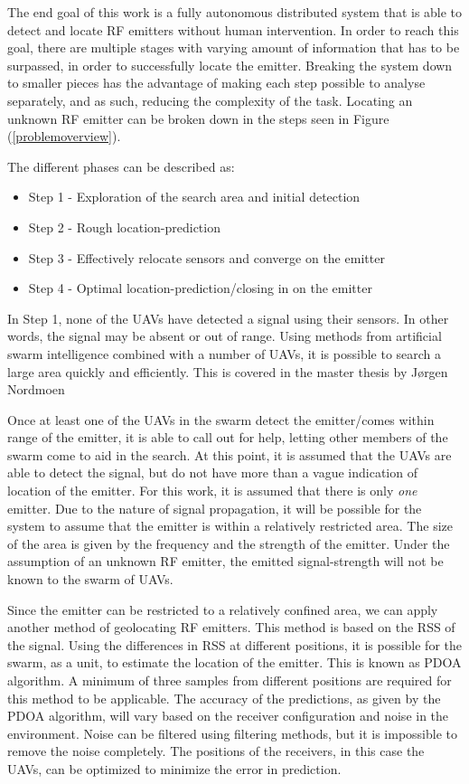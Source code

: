 \documentclass[10pt,a4paper]{book}
\begin{document}
The end goal of this work is a fully autonomous distributed system that is able to detect and locate \gls{RF} emitters without human intervention. In order to reach this goal, there are multiple stages with varying amount of information that has to be surpassed, in order to successfully locate the emitter. Breaking the system down to smaller pieces has the advantage of making each step possible to analyse separately, and as such, reducing the complexity of the task. Locating an unknown \gls{RF} emitter can be broken down in the steps seen in Figure (\ref{problemoverview}).


The different phases can be described as:
\begin{itemize}
\item Step 1 - Exploration of the search area and initial detection
\item Step 2 - Rough location-prediction
\item Step 3 - Effectively relocate sensors and converge on the emitter
\item Step 4 - Optimal location-prediction/closing in on the emitter
\end{itemize}

\newpage


In Step 1, none of the \glspl{UAV} have detected a signal using their sensors. In other words, the signal may be absent or out of range. Using methods from artificial swarm intelligence combined with a number of \glspl{UAV}, it is possible to search a large area quickly and efficiently. This is covered in the master thesis by Jørgen Nordmoen \cite{jorgenmaster}

Once at least one of the \glspl{UAV} in the swarm detect the emitter/comes within range of the emitter, it is able to call out for help, letting other members of the swarm come to aid in the search. At this point, it is assumed that the \glspl{UAV} are able to detect the signal, but do not have more than a vague indication of location of the emitter. For this work, it is assumed that there is only \textit{one} emitter. Due to the nature of signal propagation, it will be possible for the system to assume that the emitter is within a relatively restricted area. The size of the area is given by the frequency and the strength of the emitter. Under the assumption of an unknown \gls{RF} emitter, the emitted signal-strength will not be known to the swarm of \glspl{UAV}.  

Since the emitter can be restricted to a relatively confined area, we can apply another method of geolocating \gls{RF} emitters. This method is based on the \gls{RSS} of the signal. Using the differences in \gls{RSS} at different positions, it is possible for the swarm, as a unit, to estimate the location of the emitter. This is known as \gls{PDOA} algorithm. A minimum of three samples from different positions are required for this method to be applicable. The accuracy of the predictions, as given by the \gls{PDOA} algorithm, will vary based on the receiver configuration and noise in the environment. Noise can be filtered using filtering methods, but it is impossible to remove the noise completely. The positions of the receivers, in this case the \glspl{UAV}, can be optimized to minimize the error in prediction. 
\end{document}
